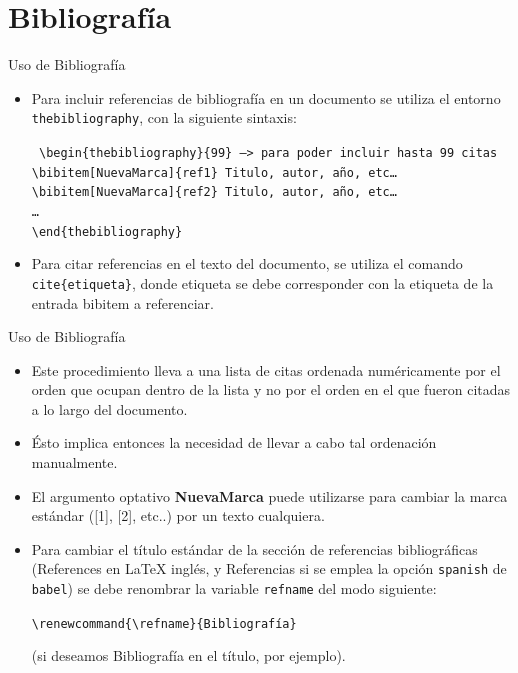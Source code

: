 \documentclass[12pt]{beamer}
\begin{document}
\section{Bibliograf\'ia}
\begin{frame}{Uso de Bibliograf\'ia}
  \begin{itemize}
    \item Para incluir referencias de bibliograf\'ia en un documento se utiliza el entorno \texttt{\color{blue}thebibliography},
    con la siguiente sintaxis:
    \begin{block}{}
      \footnotesize
      \texttt{\color{blue}
      \textbackslash begin\{thebibliography\}\{99\} --> para poder incluir hasta 99 citas\\
      \textbackslash bibitem[NuevaMarca]\{ref1\} Titulo, autor, año, etc\ldots\\
       \textbackslash bibitem[NuevaMarca]\{ref2\} Titulo, autor, año, etc\ldots\\
        \ldots\\
        \textbackslash end\{thebibliography\}}
    \end{block}
    \item<2-> Para citar referencias en el texto del documento, se utiliza el comando \texttt{\color{blue}cite\{etiqueta\}}, donde etiqueta se debe corresponder con la etiqueta de la entrada bibitem a referenciar.
  \end{itemize}
\end{frame}
\begin{frame}{Uso de Bibliograf\'ia}
  \begin{itemize}
    \item Este procedimiento lleva a una lista de citas ordenada numéricamente por el orden que ocupan dentro de la lista y no por el orden en el que fueron citadas a lo largo del documento.
    \item<2-> Ésto implica entonces la necesidad de llevar a cabo tal ordenación manualmente.
    \item<3-> El argumento optativo {\bf NuevaMarca} puede utilizarse para cambiar la marca estándar ([1], [2], etc..) por un texto
    cualquiera.
    \item<4-> Para cambiar el título estándar de la sección de referencias bibliográficas (References en \LaTeX{} inglés, y Referencias si se emplea la opción \texttt{\color{blue}spanish} de \texttt{\color{blue}babel}) se debe renombrar la variable \texttt{\color{blue}refname} del modo siguiente:
    
    \texttt{\color{blue}\textbackslash renewcommand\{\textbackslash refname\}\{Bibliografía\}}

    (si deseamos Bibliografía en el título, por ejemplo).
  \end{itemize}
\end{frame}
\end{document}
